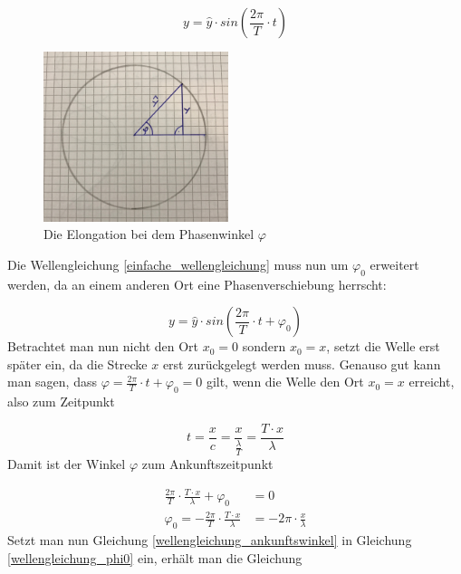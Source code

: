 \documentclass[a4paper]{article}
\begin{document}
			\begin{equation}\label{einfache_wellengleichung}
				y=\hat{y}\cdot sin\left(\frac{2\pi}{T}\cdot t\right)
			\end{equation}
			
			
			\begin{figure}[ht]
				\centering
				\includegraphics[width=0.48\textwidth]{img/welle_zeigerdarstellung.jpg}
				\caption{Die Elongation bei dem Phasenwinkel $\varphi$}
				\label{img:welle_zeigerdarstellung}
			\end{figure}
		
		
			\noindent Die Wellengleichung \ref{einfache_wellengleichung} muss nun um $\varphi_0$ erweitert werden, da an einem anderen Ort eine Phasenverschiebung herrscht:
		
			\begin{equation}\label{wellengleichung_phi0}
				y=\hat{y}\cdot sin\left(\frac{2\pi}{T}\cdot t + \varphi_0\right)
			\end{equation}			
			Betrachtet man nun nicht den Ort $x_0 = 0$ sondern $x_0=x$, setzt die Welle erst später ein, da die Strecke $x$ erst zurückgelegt werden muss. Genauso gut kann man sagen, dass $\varphi=\frac{2\pi}{T}\cdot t + \varphi_0=0$ gilt, wenn die Welle den Ort $x_0=x$ erreicht, also zum Zeitpunkt 
			
			\begin{equation}
				t=\frac{x}{c} = \frac{x}{\frac{\lambda}{T}}=\frac{T\cdot x}{\lambda}
			\end{equation}
			Damit ist der Winkel $\varphi$ zum Ankunftszeitpunkt 
			
			\begin{equation}\label{wellengleichung_ankunftswinkel}
				\begin{aligned}
					\frac{2\pi}{T}\cdot \frac{T\cdot x}{\lambda} + \varphi_0 &=0\\
					\varphi_0 = - \frac{2\pi}{T}\cdot \frac{T\cdot x}{\lambda}&= - 2\pi\cdot \frac{x}{\lambda}
				\end{aligned}
			\end{equation}
			Setzt man nun Gleichung \ref{wellengleichung_ankunftswinkel} in Gleichung \ref{wellengleichung_phi0} ein, erhält man die Gleichung
			
\end{document}
